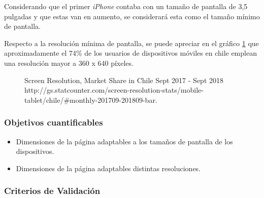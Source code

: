 Considerando que el primer \emph{iPhone} contaba con un tamaño de pantalla de 3,5 pulgadas y que estas van en aumento, se considerará esta como el tamaño mínimo de pantalla.

Respecto a la resolución mínima de pantalla, se puede apreciar en el gráfico \ref{chart:Screen Resolution} que aproximadamente el 74\% de los usuarios de dispositivos móviles en chile emplean una resolución mayor a 360 x 640 píxeles.

\begin{figure}[H]
	\centering
	\caption[Screen Resolution, Market Share in Chile Sept 2017 - Sept 2018.]{Screen Resolution, Market Share in Chile Sept 2017 - Sept 2018 \\ http://gs.statcounter.com/screen-resolution-stats/mobile-tablet/chile/\#monthly-201709-201809-bar.}
	\begin{bchart}[step=10, max=100, width=.8\textwidth, unit=\%]
	\end{bchart}
	\label{chart:Screen Resolution}
\end{figure}

\subsubsection{Objetivos cuantificables}

\begin{itemize}
	\item
	Dimensiones de la página adaptables a los tamaños de pantalla de los dispositivos.
	\item
	Dimensiones de la página adaptables distintas resoluciones.
\end{itemize}

\subsubsection{Criterios de Validación}

